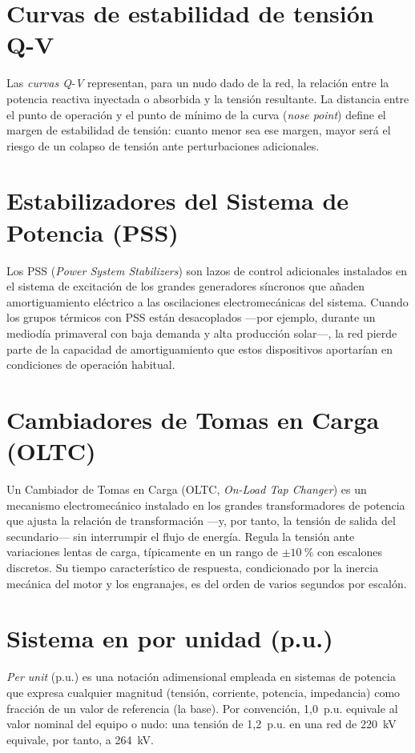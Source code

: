 \section{Curvas de estabilidad de tensión Q-V}
\label{anexo:curvas_qv}
Las \textit{curvas Q-V} representan, para un nudo dado de la red, la relación entre la potencia reactiva inyectada o absorbida y la tensión resultante. La distancia entre el punto de operación y el punto de mínimo de la curva (\textit{nose point}) define el margen de estabilidad de tensión: cuanto menor sea ese margen, mayor será el riesgo de un colapso de tensión ante perturbaciones adicionales.

\section{Estabilizadores del Sistema de Potencia (PSS)}
\label{anexo:pss}
Los PSS (\textit{Power System Stabilizers}) son lazos de control adicionales instalados en el sistema de excitación de los grandes generadores síncronos que añaden amortiguamiento eléctrico a las oscilaciones electromecánicas del sistema. Cuando los grupos térmicos con PSS están desacoplados ---por ejemplo, durante un mediodía primaveral con baja demanda y alta producción solar---, la red pierde parte de la capacidad de amortiguamiento que estos dispositivos aportarían en condiciones de operación habitual.

\section{Cambiadores de Tomas en Carga (OLTC)}
\label{anexo:oltc}
Un Cambiador de Tomas en Carga (OLTC, \textit{On-Load Tap Changer}) es un mecanismo electromecánico instalado en los grandes transformadores de potencia que ajusta la relación de transformación ---y, por tanto, la tensión de salida del secundario--- sin interrumpir el flujo de energía. Regula la tensión ante variaciones lentas de carga, típicamente en un rango de $\pm 10~\%$ con escalones discretos. Su tiempo característico de respuesta, condicionado por la inercia mecánica del motor y los engranajes, es del orden de varios segundos por escalón.

\section{Sistema en por unidad (p.u.)}
\label{anexo:pu}
\textit{Per unit} (p.u.) es una notación adimensional empleada en sistemas de potencia que expresa cualquier magnitud (tensión, corriente, potencia, impedancia) como fracción de un valor de referencia (la base). Por convención, 1,0~p.u. equivale al valor nominal del equipo o nudo: una tensión de 1,2~p.u. en una red de 220~kV equivale, por tanto, a 264~kV.

